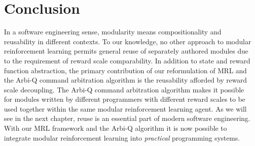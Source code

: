 \section{Conclusion}

In a software engineering sense, modularity means compositionality and reusability in different contexts. To our knowledge, no other approach to modular reinforcement learning permits general reuse of separately authored modules due to the requirement of reward scale comparability. In addition to state and reward function abstraction, the primary contribution of our reformulation of MRL and the Arbi-Q command arbitration algorithm is the reusability afforded by reward scale decoupling. The Arbi-Q command arbitration algorithm makes it possible for modules written by different programmers with different reward scales to be used together within the same modular reinforcement learning agent. As we will see in the next chapter, reuse is an essential part of modern software engineering. With our MRL framework and the Arbi-Q algorithm it is now possible to integrate modular reinforcement learning into {\it practical} programming systems.
